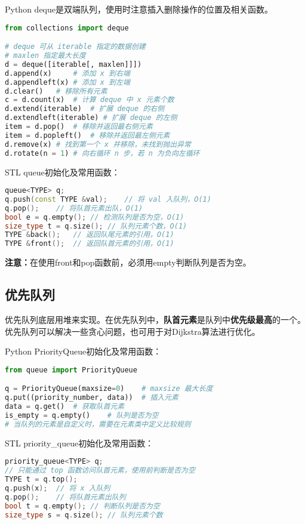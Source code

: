 Python deque是双端队列，使用时注意插入删除操作的位置及相关函数。

\begin{lstlisting}[language=python]
from collections import deque

# deque 可从 iterable 指定的数据创建
# maxlen 指定最大长度
d = deque([iterable[, maxlen]]])
d.append(x)		# 添加 x 到右端
d.appendleft(x)	# 添加 x 到左端
d.clear()	# 移除所有元素
c = d.count(x)	# 计算 deque 中 x 元素个数
d.extend(iterable)	# 扩展 deque 的右侧
d.extendleft(iterable) # 扩展 deque 的左侧
item = d.pop()	# 移除并返回最右侧元素
item = d.popleft()	# 移除并返回最左侧元素
d.remove(x)	# 找到第一个 x 并移除，未找到抛出异常
d.rotate(n = 1)	# 向右循环 n 步，若 n 为负向左循环
\end{lstlisting}

STL queue初始化及常用函数：

\begin{lstlisting}[language=c++]
queue<TYPE> q;
q.push(const TYPE &val);	// 将 val 入队列，O(1)
q.pop();	// 将队首元素出队，O(1)
bool e = q.empty();	// 检测队列是否为空，O(1)
size_type t = q.size();	// 队列元素个数，O(1)
TYPE &back();	// 返回队尾元素的引用，O(1)
TYPE &front();	// 返回队首元素的引用，O(1)
\end{lstlisting}

\textbf{注意：}在使用front和pop函数前，必须用empty判断队列是否为空。

\subsection{优先队列}

优先队列底层用堆来实现。在优先队列中，\textbf{队首元素}是队列中\textbf{优先级最高}的一个。优先队列可以解决一些贪心问题，也可用于对Dijkstra算法进行优化。

Python PriorityQueue初始化及常用函数：

\begin{lstlisting}[language=python]
from queue import PriorityQueue

q = PriorityQueue(maxsize=0)	# maxsize 最大长度
q.put((priority_number, data))	# 插入元素
data = q.get()	# 获取队首元素
is_empty = q.empty()	# 队列是否为空
# 当队列的元素是自定义时，需要在元素类中定义比较规则
\end{lstlisting}

STL priority\_queue初始化及常用函数：

\begin{lstlisting}[language=c++]
priority_queue<TYPE> q;
// 只能通过 top 函数访问队首元素，使用前判断是否为空
TYPE t = q.top();
q.push(x);	// 将 x 入队列
q.pop();	// 将队首元素出队列
bool t = q.empty();	// 判断队列是否为空
size_type s = q.size();	// 队列元素个数
\end{lstlisting}

